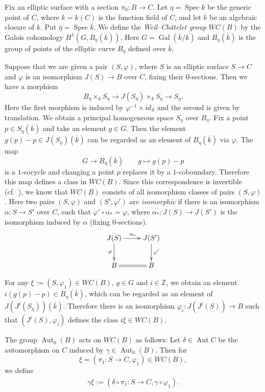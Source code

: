 \documentclass[a4paper,11pt]{article}
\theoremstyle{definition}\newtheorem{defn}[thm]{Definition}
\theoremstyle{remark}\newtheorem{remark}[thm]{Remark}
\numberwithin{equation}{section}
\newcommand{\Aut}{\ensuremath{\operatorname{Aut}}}
\newcommand{\Spec}{\ensuremath{\operatorname{Spec}}}
\newcommand{\Gal}{\operatorname{Gal}}
\newcommand{\Z}{\mathbb Z}
\begin{document}
Fix an elliptic surface with a section 
$\pi_0\colon B\to C$. Let $\eta=\Spec k$ be the 
generic point of $C$,
where $k=k(C)$ is the function field of $C$, and let $\overline{k}$ be an 
algebraic closure of $k$.
Put $\overline{\eta}=\Spec \overline{k}$. We define the 
\emph{Weil--Ch\^atelet group} $WC(B)$
by the Galois cohomology $H^1(G, B_{\eta}(\overline{k}))$. 
Here $G=\Gal(\overline{k}/k)$ and $B_{\eta}(\overline{k})$ 
is the group of points of the elliptic curve $B_{\eta}$ defined over 
$\overline{k}$. 

Suppose that we are given a pair $(S,\varphi)$, where $S$ is 
an elliptic surface $S\to C$ and 
$\varphi$ is an isomorphism $J(S)\to B$ over $C$, fixing their $0$-sections. 
Then we have a morphism 
$$
B_{\eta}\times_k S_{\eta}\to J(S_{\eta})\times_k  S_{\eta}\to S_{\eta}.
$$
Here the first morphism is induced by $\varphi^{-1}\times id_S$ and 
the second is given by translation.
We obtain a principal homogeneous space $S_{\eta}$ over $B_{\eta}$.
Fix a point $p\in S_\eta(\overline{k})$ and 
take an element $g\in G$. Then the element $g(p)-p\in J(S_\eta)(\overline{k})$ 
can be regarded as an element
of $B_\eta(\overline{k})$ via $\varphi$. 
The map
$$
G\to B_\eta(\overline{k}) \qquad g\mapsto g(p)-p 
$$
is a $1$-cocycle and changing 
a point $p$ replaces it by a $1$-coboundary. 
Therefore this map defines a 
class in $WC(B)$.
Since this correspondence is invertible (cf.~\cite{Se02}),
we know that $WC(B)$ consists of all isomorphism
 classes of pairs $(S,\varphi)$.
Here two pairs $(S,\varphi)$ and $(S',\varphi ')$ are \emph{isomorphic} 
if there is an isomorphism 
$\alpha :S\to S'$ over $C$, such that $\varphi '\circ \alpha _* =\varphi$,
where $\alpha _*:J(S)\to J(S')$ is the isomorphism induced by $\alpha$ 
(fixing $0$-sections). 
%
\noindent
\[ \xymatrix{ J(S) \ar[d]_{\varphi} \ar[r] ^{\alpha _*} & J(S') \ar[d]^{\varphi '} \\  B \ar@{=}[r] & B}\]
\noindent

For any $\xi:=(S,\varphi_1)\in WC(B)$, $g\in G$ and $i\in \Z$, 
we obtain an element $i(g(p)-p)\in B_\eta(\overline{k})$, which can be regarded 
as an element of $J(J^i(S_\eta))(\overline{k})$. Therefore
there is an isomorphism $\varphi_i: J(J^i(S))\to B$ such that 
$(J^i(S),\varphi_i)$ defines the class $i\xi\in WC(B)$. %


The group $\Aut _0(B)$ acts on $WC(B)$ as follows:
Let $\delta\in \Aut C$ be the automorphism on $C$ 
induced by $\gamma\in\Aut _0(B)$. Then for 
$$
\xi=(\pi_1\colon S\to C,\varphi_1)\in WC(B),
$$
we define 
\begin{align}\label{eqn:action}
\gamma \xi:=(\delta \circ \pi_1\colon S\to C,\gamma \circ \varphi_1).
\end{align}
\end{document}
